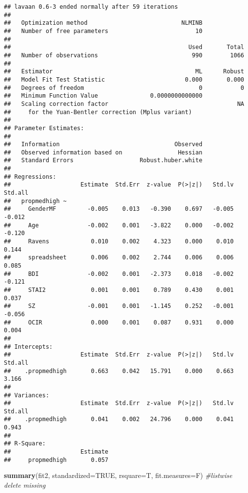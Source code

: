 \documentclass[]{article}
\newenvironment{Shaded}{\begin{snugshade}}{\end{snugshade}}
\newcommand{\KeywordTok}[1]{\textcolor[rgb]{0.13,0.29,0.53}{\textbf{#1}}}
\newcommand{\DataTypeTok}[1]{\textcolor[rgb]{0.13,0.29,0.53}{#1}}
\newcommand{\CommentTok}[1]{\textcolor[rgb]{0.56,0.35,0.01}{\textit{#1}}}
\newcommand{\OtherTok}[1]{\textcolor[rgb]{0.56,0.35,0.01}{#1}}
\newcommand{\NormalTok}[1]{#1}
\begin{document}
\begin{verbatim}
## lavaan 0.6-3 ended normally after 59 iterations
## 
##   Optimization method                           NLMINB
##   Number of free parameters                         10
## 
##                                                   Used       Total
##   Number of observations                           990        1066
## 
##   Estimator                                         ML      Robust
##   Model Fit Test Statistic                       0.000       0.000
##   Degrees of freedom                                 0           0
##   Minimum Function Value               0.0000000000000
##   Scaling correction factor                                     NA
##     for the Yuan-Bentler correction (Mplus variant)
## 
## Parameter Estimates:
## 
##   Information                                 Observed
##   Observed information based on                Hessian
##   Standard Errors                   Robust.huber.white
## 
## Regressions:
##                    Estimate  Std.Err  z-value  P(>|z|)   Std.lv  Std.all
##   propmedhigh ~                                                         
##     GenderMF         -0.005    0.013   -0.390    0.697   -0.005   -0.012
##     Age              -0.002    0.001   -3.822    0.000   -0.002   -0.120
##     Ravens            0.010    0.002    4.323    0.000    0.010    0.144
##     spreadsheet       0.006    0.002    2.744    0.006    0.006    0.085
##     BDI              -0.002    0.001   -2.373    0.018   -0.002   -0.121
##     STAI2             0.001    0.001    0.789    0.430    0.001    0.037
##     SZ               -0.001    0.001   -1.145    0.252   -0.001   -0.056
##     OCIR              0.000    0.001    0.087    0.931    0.000    0.004
## 
## Intercepts:
##                    Estimate  Std.Err  z-value  P(>|z|)   Std.lv  Std.all
##    .propmedhigh       0.663    0.042   15.791    0.000    0.663    3.166
## 
## Variances:
##                    Estimate  Std.Err  z-value  P(>|z|)   Std.lv  Std.all
##    .propmedhigh       0.041    0.002   24.796    0.000    0.041    0.943
## 
## R-Square:
##                    Estimate
##     propmedhigh       0.057
\end{verbatim}

\begin{Shaded}
\begin{Highlighting}[]
\KeywordTok{summary}\NormalTok{(fit2, }\DataTypeTok{standardized=}\OtherTok{TRUE}\NormalTok{, }\DataTypeTok{rsquare=}\NormalTok{T, }\DataTypeTok{fit.measures=}\NormalTok{F) }\CommentTok{#listwise delete missing}
\end{Highlighting}
\end{Shaded}
\end{document}

